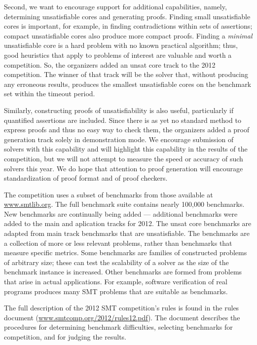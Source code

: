 \documentclass{llncs}
\begin{document}
Second, we
want to encourage support for additional capabilities, namely, determining unsatisfiable cores and generating proofs.
Finding small unsatisfiable cores is important, for example, in finding contradictions within sets of assertions; compact unsatisfiable cores also produce more compact proofs. Finding a {\em minimal} unsatisfiable core is a hard problem with no known practical algorithm;
thus, good heuristics that apply to problems of interest are valuable and worth a competition. So, the organizers added
an unsat core track to the 2012 competition. The winner of that track will be the solver that, without producing any erroneous results, produces the smallest unsatisfiable cores on the benchmark set within the timeout period.

Similarly, constructing proofs of unsatisfiability is also useful, particularly if quantified assertions are included.
Since there is as yet no standard method to express proofs and thus no easy way to check them, the organizers added a proof generation track solely in demonstration mode. We encourage submission of solvers with this capability and will highlight this capability in the results of the competition, but we will not attempt to measure the speed or accuracy of such solvers this year. We do hope that
attention to proof generation will encourage standardization of proof format and of proof checkers.

The competition uses a subset of benchmarks from those available at \url{www.smtlib.org}. The full benchmark suite contains nearly 100,000 benchmarks. New benchmarks are continually being added --- additional benchmarks were added to the main and aplication tracks for 2012. The unsat core benchmarks are adapted from main track benchmarks that are unsatisfiable. The benchmarks are a collection of more or less relevant problems, rather than benchmarks that measure specific metrics.
Some benchmarks are families of constructed problems of arbitrary size; these can test the scalability of a solver as
the size of the benchmark instance is increased. Other benchmarks are formed from problems that arise in actual 
applications. For example, software verification of real programs produces many SMT problems that are suitable as benchmarks.

The full description of the 2012 SMT competition's rules is found in the rules document (\url{www.smtcomp.org/2012/rules12.pdf}). The document describes the procedures for determining benchmark difficulties, selecting benchmarks for competition, and for judging the results.
\end{document}
